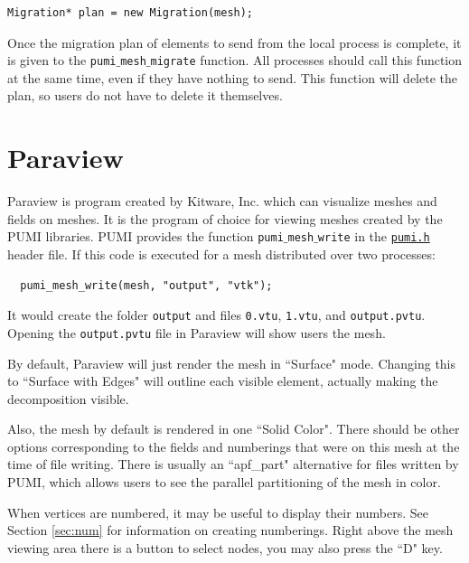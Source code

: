\documentclass{article}
\begin{document}
\begin{lstlisting}
Migration* plan = new Migration(mesh);
\end{lstlisting}

Once the migration plan of elements to send from
the local process is complete, it is given to the
\texttt{pumi$\_$mesh$\_$migrate} function.
All processes should call this function at the
same time, even if they have nothing to send.
This function will delete the plan, so users
do not have to delete it themselves.

\appendix

\section{Paraview}
\label{sec:paraview}

Paraview is program created by Kitware, Inc. which can visualize meshes
and fields on meshes.
It is the program of choice for viewing meshes created by the PUMI libraries.
PUMI provides the function \texttt{pumi$\_$mesh$\_$write}
in the \href{https://github.com/SCOREC/core/blob/master/pumi/pumi.h}
{\texttt{pumi.h}} header file.
If this code is executed for a mesh distributed over two processes:

\begin{lstlisting}
  pumi_mesh_write(mesh, "output", "vtk");
\end{lstlisting}

It would create the folder \texttt{output} and files \texttt{0.vtu}, \texttt{1.vtu},
and \texttt{output.pvtu}.
Opening the \texttt{output.pvtu} file in Paraview will show users the
mesh.

By default, Paraview will just render the mesh in ``Surface" mode.
Changing this to ``Surface with Edges" will outline each visible element,
actually making the decomposition visible.

Also, the mesh by default is rendered in one ``Solid Color".
There should be other options corresponding to the fields and numberings
that were on this mesh at the time of file writing.
There is usually an ``apf\_part" alternative for files written by PUMI, which
allows users to see the parallel partitioning of the mesh in color.

When vertices are numbered, it may be useful to display their numbers.
See Section \ref{sec:num} for information on creating numberings.
Right above the mesh viewing area there is a button to select nodes,
you may also press the ``D" key.
\end{document}
